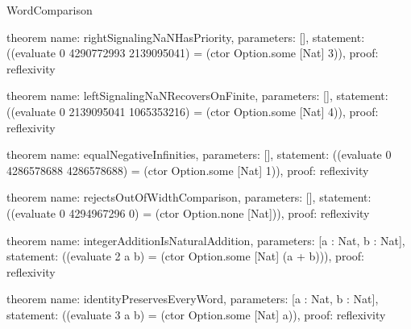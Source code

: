 \begin{lexlean}{WordComparison}
\begin{semanticmodule}
theorem{
  name: rightSignalingNaNHasPriority,
  parameters: [],
  statement: ((evaluate 0 4290772993 2139095041) = (ctor Option.some [Nat] 3)),
  proof: reflexivity{}
}

theorem{
  name: leftSignalingNaNRecoversOnFinite,
  parameters: [],
  statement: ((evaluate 0 2139095041 1065353216) = (ctor Option.some [Nat] 4)),
  proof: reflexivity{}
}

theorem{
  name: equalNegativeInfinities,
  parameters: [],
  statement: ((evaluate 0 4286578688 4286578688) = (ctor Option.some [Nat] 1)),
  proof: reflexivity{}
}

theorem{
  name: rejectsOutOfWidthComparison,
  parameters: [],
  statement: ((evaluate 0 4294967296 0) = (ctor Option.none [Nat])),
  proof: reflexivity{}
}

theorem{
  name: integerAdditionIsNaturalAddition,
  parameters: [a : Nat, b : Nat],
  statement: ((evaluate 2 a b) = (ctor Option.some [Nat] (a + b))),
  proof: reflexivity{}
}

theorem{
  name: identityPreservesEveryWord,
  parameters: [a : Nat, b : Nat],
  statement: ((evaluate 3 a b) = (ctor Option.some [Nat] a)),
  proof: reflexivity{}
}
\end{semanticmodule}
\end{lexlean}
